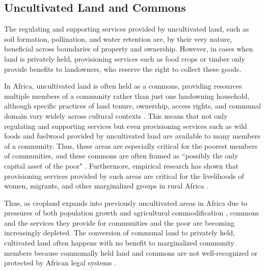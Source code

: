 \documentclass{article}
\begin{document}
\subsection{Uncultivated Land and Commons}
The regulating and supporting services provided by uncultivated land, such as soil formation, pollination, and water retention are, by their very nature, beneficial across boundaries of property and ownership.  However, in cases when land is privately held, provisioning services such as food crops or timber only provide benefits to landowners, who reserve the right to collect these goods.  

In Africa, uncultivated land is often held as a commons, providing resources multiple members of a community rather than just one landowning household, although specific practices of land tenure, ownership, access rights, and communal domain vary widely across cultural contexts \cite{Wily2008}.  This means that not only regulating and supporting services but even provisioning services such as wild foods and fuelwood provided by uncultivated land are available to many members of a community.  Thus, these areas are especially critical for the poorest members of communities, and these commons are often framed as ``possibly the only capital asset of the poor" \cite{Wily2008}.  Furthermore, empirical research has shown that provisioning services provided by such areas are critical for the livelihoods of women, migrants, and other marginalized groups in rural Africa \cite{Coulibaly-Lingani2009, Pouliot2013}.

Thus, as cropland expands into previously uncultivated areas in Africa due to pressures of both population growth and agricultural commodification \cite{Rudel2013, Laurance2014}, commons and the services they provide for communities and the poor are becoming increasingly depleted.  The conversion of communal land to privately held, cultivated land often happens with no benefit to marginalized community members because communally held land and commons are not well-recognized or protected by African legal systems \cite{Wily2011}.
\end{document}
